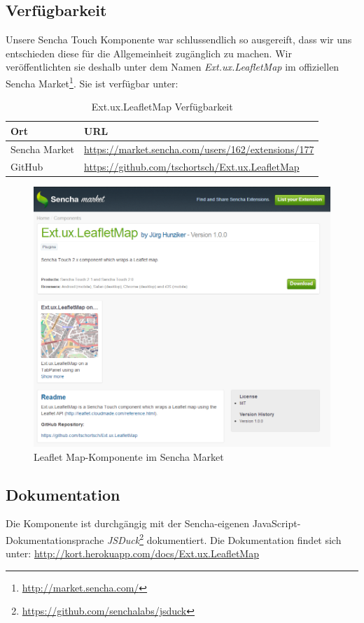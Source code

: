 \subsection{Verfügbarkeit}
Unsere Sencha Touch Komponente war schlussendlich so ausgereift, dass wir uns entschieden diese für die Allgemeinheit zugänglich zu machen.
Wir veröffentlichten sie deshalb unter dem Namen \emph{Ext.ux.LeafletMap} im offiziellen Sencha Market\footnote{\url{http://market.sencha.com/}}.
Sie ist verfügbar unter:

\begin{table}[H]
\centering
\begin{tabular}{|p{0.2\twocelltabwidth}|p{0.8\twocelltabwidth}|}
\hline 
\textbf{Ort} & \textbf{URL} \\ 
\hline 
Sencha Market & \url{https://market.sencha.com/users/162/extensions/177} \\ 
\hline 
GitHub & \url{https://github.com/tschortsch/Ext.ux.LeafletMap} \\ 
\hline 
\end{tabular} 
\caption{Ext.ux.LeafletMap Verfügbarkeit}
\label{leafletmap-availiblity}
\end{table}

\begin{figure}[H]
	\centering
	\includegraphics[scale=0.6]{images/implementation/leafletmap-sencha-market}
	\caption{Leaflet Map-Komponente im Sencha Market}
	\label{image-leafletmap-sencha-market}
\end{figure}

\subsection{Dokumentation}
Die Komponente ist durchgängig mit der Sencha-eigenen JavaScript-Dokumentationsprache \emph{JSDuck}\footnote{\url{https://github.com/senchalabs/jsduck}} dokumentiert. Die Dokumentation findet sich unter: \url{http://kort.herokuapp.com/docs/Ext.ux.LeafletMap}